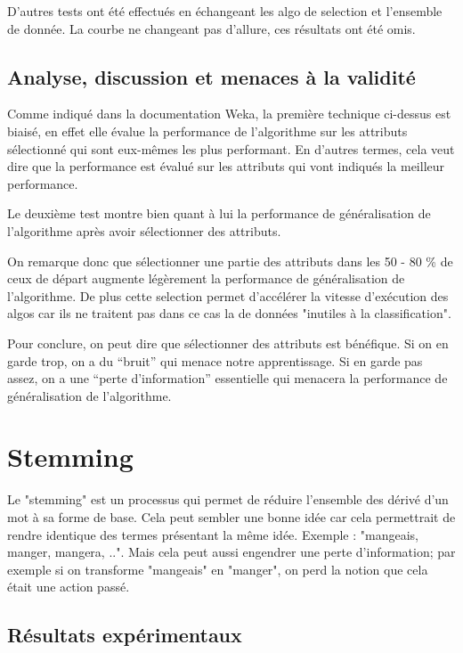 \documentclass[a4paper,10pt]{article}
\begin{document}
D'autres tests ont été effectués en échangeant les algo de selection et l'ensemble de donnée. La courbe ne changeant pas d'allure, ces résultats ont été omis.

\subsection{Analyse, discussion et menaces à la validité}

Comme indiqué dans la documentation Weka, la première technique ci-dessus est biaisé, en effet elle évalue la performance de l'algorithme sur les attributs sélectionné qui sont eux-mêmes les plus performant. En d'autres termes, cela veut dire que la performance est évalué sur les attributs qui vont indiqués la meilleur performance.

Le deuxième test montre bien quant à lui la performance de généralisation de l'algorithme après avoir sélectionner des attributs.

On remarque donc que sélectionner une partie des attributs dans les 50 - 80 \% de ceux de départ augmente légèrement la performance de généralisation de l'algorithme. De plus cette selection permet d'accélérer la vitesse d'exécution des algos car ils ne traitent pas dans ce cas la de données "inutiles à la classification".

Pour conclure, on peut dire que sélectionner des attributs est bénéfique. Si on en garde trop, on a du “bruit” qui menace notre apprentissage. Si en garde pas assez, on a une “perte d’information” essentielle qui menacera la performance de généralisation de l'algorithme.

\section{Stemming}

Le "stemming" est un processus qui permet de réduire l'ensemble des dérivé d'un mot à sa forme de base. Cela peut sembler une bonne idée car cela permettrait de rendre identique des termes présentant la même idée. Exemple : "mangeais, manger, mangera, ..". Mais cela peut aussi engendrer une perte d'information; par exemple si on transforme "mangeais" en "manger", on perd la notion que cela était une action passé.

\subsection{Résultats expérimentaux}
\end{document}
